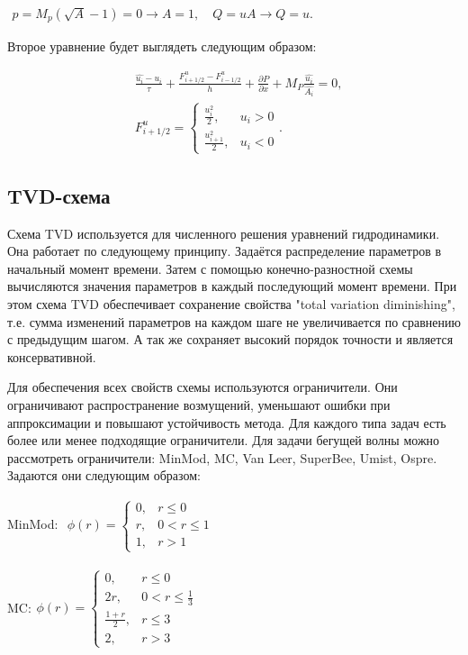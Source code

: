 $
\begin{aligned} 
    p=M_p(\sqrt{A}-1)=0\longrightarrow A=1, \quad
    Q=uA \longrightarrow
    Q=u.
\end{aligned}
$

Второе уравнение будет выглядеть следующим образом:

$$
\begin{aligned}
    &\frac{\hat{u_i}-u_i}{\tau}+\frac{F_{i+1/2}^u-F_{i-1/2}^u}{h}+\frac{\partial P}{\partial x}+M_P\frac{\hat{u_i}}{\hat{A_i}}=0,\\
    &F_{i+1/2}^u=\begin{cases}
        \frac{u_i^2}{2}, &u_i>0\\
        \frac{u_{i+1}^2}{2}, &u_i<0
    \end{cases}.
\end{aligned}
$$



\subsection*{TVD-схема}
Схема TVD используется для численного решения уравнений гидродинамики. Она работает по следующему принципу.
Задаётся распределение параметров в начальный момент времени. 
Затем с помощью конечно-разностной схемы вычисляются значения параметров в каждый последующий момент времени. 
При этом схема TVD обеспечивает сохранение свойства "total variation diminishing", т.е. сумма изменений параметров 
на каждом шаге не увеличивается по сравнению с предыдущим шагом. А так же сохраняет высокий порядок точности и является консервативной.

Для обеспечения всех свойств схемы используются ограничители. Они ограничивают распространение возмущений, уменьшают ошибки при
аппроксимации и повышают устойчивость метода. 
Для каждого типа задач есть более или менее подходящие ограничители. Для задачи бегущей волны можно рассмотреть ограничители:
MinMod, MC, Van Leer, SuperBee, Umist, Ospre.
Задаются они следующим образом:

MinMod: $
\begin{aligned}
	\phi(r)=\begin{cases}
        0, &r\leq 0\\
        r, &0<r\leq 1\\
        1, &r>1
    \end{cases}
\end{aligned}
$


MC:$
\begin{aligned}
     \phi(r)=\begin{cases}
        0, &r\leq0\\
        2r, &0<r\leq\frac{1}{3}\\
        \frac{1+r}{2}, &r\leq3\\
        2, &r>3
    \end{cases}
\end{aligned}
$ 


